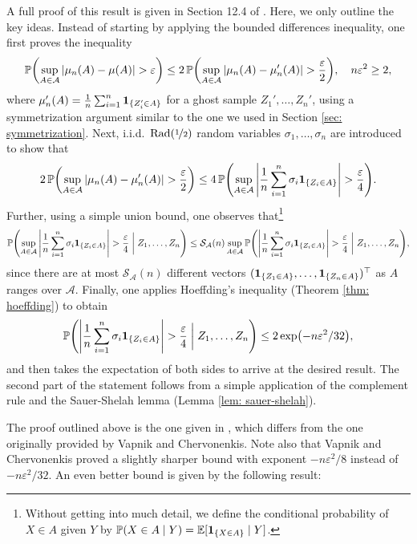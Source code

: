 A full proof of this result is given in Section 12.4 of \cite{devroye1996probabilistic}. Here, we only outline the key ideas. Instead of starting by applying the bounded differences inequality, one first proves the inequality
\[
    \Prob\left(\sup_{A \in \mathcal{A}} \abs{\mu_n(A) - \mu(A)} > \varepsilon\right) \leq 2 \Prob\left(\sup_{A \in \mathcal{A}} \abs{\mu_n(A) - \mu_n'(A)} > \frac{\varepsilon}{2}\right), \quad n \varepsilon^2 \geq 2,
\]
where $\mu_n'(A) = \frac{1}{n} \sum_{i=1}^n \mathbf{1}_{\{Z_i' \in A\}}$ for a ghost sample $Z_1', \dots, Z_n'$, using a symmetrization argument similar to the one we used in Section \ref{sec: symmetrization}. Next, i.i.d.\ $\operatorname{Rad}(\nicefrac{1}{2})$ random variables $\sigma_1, \dots, \sigma_n$ are introduced to show that
\[
    2 \Prob\left(\sup_{A \in \mathcal{A}} \abs{\mu_n(A) - \mu_n'(A)} > \frac{\varepsilon}{2}\right) \leq 4 \Prob\left(\sup_{A \in \mathcal{A}} \abs{\frac{1}{n} \sum_{i=1}^n \sigma_i \indSet{Z_i \in A}} > \frac{\varepsilon}{4}\right).
\]
Further, using a simple union bound, one observes that\footnote{Without getting into much detail, we define the conditional probability of $X \in A$ given $Y$ by $\Prob(X \in A \given Y) = \Exp[\indSet{X \in A} \given Y]$.}
\[
    \Prob\left(\sup_{A \in \mathcal{A}} \abs{\frac{1}{n} \sum_{i=1}^n \sigma_i \indSet{Z_i \in A}} > \frac{\varepsilon}{4} \given[\bigg] Z_1, \dots, Z_n\right) \leq \mathcal{S}_{\mathcal{A}}(n) \sup_{A \in \mathcal{A}} \Prob\left(\abs{\frac{1}{n} \sum_{i=1}^n \sigma_i \indSet{Z_i \in A}} > \frac{\varepsilon}{4} \given[\bigg] Z_1, \dots, Z_n\right),
\]
since there are at most $\mathcal{S}_{\mathcal{A}}(n)$ different vectors $(\indSet{Z_1 \in A}, \dots, \indSet{Z_n \in A})^{\top}$ as $A$ ranges over $\mathcal{A}$. Finally, one applies Hoeffding's inequality (Theorem \ref{thm: hoeffding}) to obtain
\[
    \Prob\left(\abs{\frac{1}{n} \sum_{i=1}^n \sigma_i \indSet{Z_i \in A}} > \frac{\varepsilon}{4} \given[\bigg] Z_1, \dots, Z_n\right) \leq 2 \exp(-n\varepsilon^2 / 32),
\]
and then takes the expectation of both sides to arrive at the desired result. The second part of the statement follows from a simple application of the complement rule and the Sauer-Shelah lemma (Lemma \ref{lem: sauer-shelah}).

The proof outlined above is the one given in \cite{devroye1996probabilistic}, which differs from the one originally provided  by Vapnik and Chervonenkis. Note also that Vapnik and Chervonenkis proved a slightly sharper bound with exponent $-n \varepsilon^2 / 8$ instead of $-n \varepsilon^2 / 32$. An even better bound is given by the following result:

